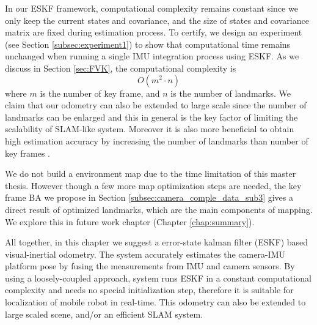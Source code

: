 In our ESKF framework, computational complexity remains constant since we only keep the current states and covariance, and the size of states and covariance matrix are fixed during estimation process. To certify, we design an experiment (see Section \ref{subsec:experiment1}) to show that computational time remains unchanged when running a single IMU integration process using ESKF. As we discuss in Section \ref{sec:FVK}, the computational complexity is 
\begin{equation}
	O(m^2 \cdot n)
\end{equation}
where $m$ is the number of key frame, and $n$ is the number of landmarks. We claim that our odometry can also be extended to large scale since the number of landmarks can be enlarged and this in general is the key factor of limiting the scalability of SLAM-like system. Moreover it is also more beneficial to obtain high estimation accuracy by increasing the number of landmarks than number of key frames \cite{strasdat2010real}.

We do not build a environment map due to the time limitation of this master thesis. However though a few more map optimization steps are needed, the key frame BA we propose in Section \ref{subsec:camera_comple_data_sub3} gives a direct result of optimized landmarks, which are the main components of mapping. We explore this in future work chapter (Chapter \ref{chap:summary}).

All together, in this chapter we suggest a error-state kalman filter (ESKF) based visual-inertial odometry. The system accurately estimates the camera-IMU platform pose by fusing the measurements from IMU and camera sensors. By using a loosely-coupled approach, system runs ESKF in a constant computational complexity and needs no special initialization step, therefore it is suitable for localization of mobile robot in real-time. This odometry can also be extended to large scaled scene, and/or an efficient SLAM system.

